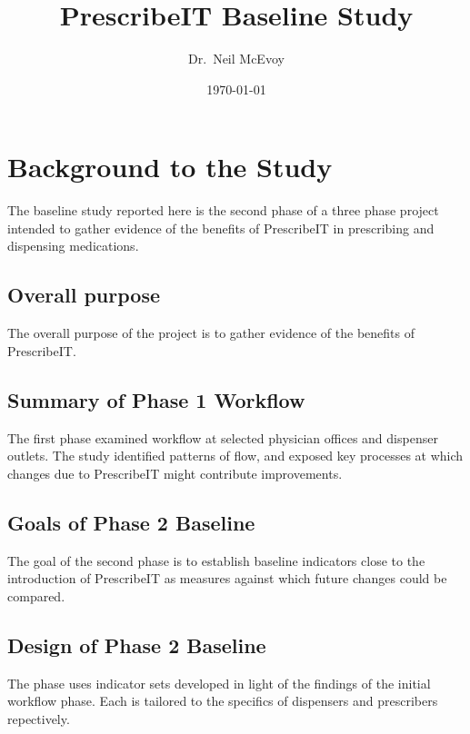\documentclass[10,letterpaperpaper,]{article}
\title{PrescribeIT Baseline Study}
\author{Dr.~Neil McEvoy}
\date{\today}
\begin{document}
\renewcommand{\contentsname}{Inhaltsverzeichnis}

\renewcommand{\pagename}{Seite}


\maketitle

\tableofcontents
{} \clearpage

\section{Background to the Study}

The baseline study reported here is the second phase of a three phase
project intended to gather evidence of the benefits of PrescribeIT in
prescribing and dispensing medications.

\subsection{Overall purpose}

The overall purpose of the project is to gather evidence of the benefits
of PrescribeIT.

\subsection{Summary of Phase 1 Workflow}

The first phase examined workflow at selected physician offices and
dispenser outlets. The study identified patterns of flow, and exposed
key processes at which changes due to PrescribeIT might contribute
improvements.

\subsection{Goals of Phase 2 Baseline}

The goal of the second phase is to establish baseline indicators close
to the introduction of PrescribeIT as measures against which future
changes could be compared.

\subsection{Design of Phase 2 Baseline}

The phase uses indicator sets developed in light of the findings of the
initial workflow phase. Each is tailored to the specifics of dispensers
and prescribers repectively.
\end{document}
